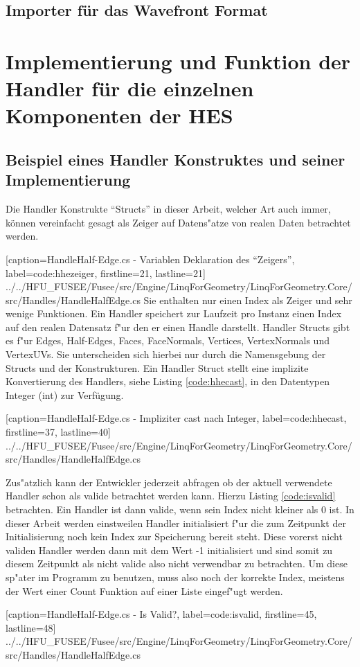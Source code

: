 \documentclass[12pt,a4paper]{scrreprt}
\begin{document}
		\subsection {Importer für das Wavefront Format}
	\section {Implementierung und Funktion der Handler für die einzelnen Komponenten der HES}
		\subsection {Beispiel eines Handler Konstruktes und seiner Implementierung}
Die Handler Konstrukte "`Structs"' in dieser Arbeit, welcher Art auch immer, können vereinfacht gesagt als Zeiger auf Datens"atze von realen Daten betrachtet werden.

			[caption={HandleHalf-Edge.cs - Variablen Deklaration des "`Zeigers"'}, label=code:hhezeiger, firstline=21, lastline=21]
			{../../HFU_FUSEE/Fusee/src/Engine/LinqForGeometry/LinqForGeometry.Core/src/Handles/HandleHalfEdge.cs}
Sie enthalten nur einen Index als Zeiger und sehr wenige Funktionen. Ein Handler speichert zur Laufzeit pro Instanz einen Index auf den realen Datensatz f"ur den er einen Handle darstellt. Handler Structs gibt es f"ur Edges, Half-Edges, Faces, FaceNormals, Vertices, VertexNormals und VertexUVs. Sie unterscheiden sich hierbei nur durch die Namensgebung der Structs und der Konstrukturen.
Ein Handler Struct stellt eine implizite Konvertierung des Handlers, siehe Listing \ref{code:hhecast}, in den Datentypen Integer (int) zur Verfügung.

			[caption={HandleHalf-Edge.cs - Impliziter cast nach Integer}, label=code:hhecast, firstline=37, lastline=40]
			{../../HFU_FUSEE/Fusee/src/Engine/LinqForGeometry/LinqForGeometry.Core/src/Handles/HandleHalfEdge.cs}

Zus"atzlich kann der Entwickler jederzeit abfragen ob der aktuell verwendete Handler schon als valide betrachtet werden kann. Hierzu Listing \ref{code:isvalid} betrachten. Ein Handler ist dann valide, wenn sein Index nicht kleiner als 0 ist. In dieser Arbeit werden einstweilen Handler initialisiert f"ur die zum Zeitpunkt der Initialisierung noch kein Index zur Speicherung bereit steht. Diese vorerst nicht validen Handler werden dann mit dem Wert -1 initialisiert und sind somit zu diesem Zeitpunkt als nicht valide also nicht verwendbar zu betrachten. Um diese sp"ater im Programm zu benutzen, muss also noch der korrekte Index, meistens der Wert einer Count Funktion auf einer Liste eingef"ugt werden.

			[caption={HandleHalf-Edge.cs - Is Valid?}, label=code:isvalid, firstline=45, lastline=48]
			{../../HFU_FUSEE/Fusee/src/Engine/LinqForGeometry/LinqForGeometry.Core/src/Handles/HandleHalfEdge.cs}
\end{document}
